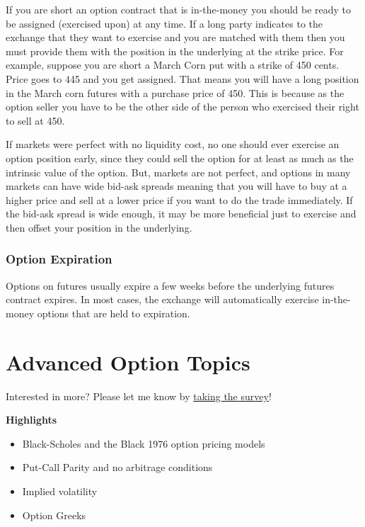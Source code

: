 \documentclass[
  letterpaper,
  DIV=11,
  numbers=noendperiod]{scrreprt}
\begin{document}
If you are short an option contract that is in-the-money you should be
ready to be assigned (exercised upon) at any time. If a long party
indicates to the exchange that they want to exercise and you are matched
with them then you must provide them with the position in the underlying
at the strike price. For example, suppose you are short a March Corn put
with a strike of 450 cents. Price goes to 445 and you get assigned. That
means you will have a long position in the March corn futures with a
purchase price of 450. This is because as the option seller you have to
be the other side of the person who exercised their right to sell at
450.

If markets were perfect with no liquidity cost, no one should ever
exercise an option position early, since they could sell the option for
at least as much as the intrinsic value of the option. But, markets are
not perfect, and options in many markets can have wide bid-ask spreads
meaning that you will have to buy at a higher price and sell at a lower
price if you want to do the trade immediately. If the bid-ask spread is
wide enough, it may be more beneficial just to exercise and then offset
your position in the underlying.

\subsection{Option Expiration}\label{option-expiration}

Options on futures usually expire a few weeks before the underlying
futures contract expires. In most cases, the exchange will automatically
exercise in-the-money options that are held to expiration.


\chapter{Advanced Option Topics}\label{advanced-option-topics}

{Interested in more? Please let me know by}
\href{https://forms.gle/Q3VByCQZHjfQSy9D7}{taking the survey}!

\textbf{Highlights}

\begin{itemize}
\item
  Black-Scholes and the Black 1976 option pricing models
\item
  Put-Call Parity and no arbitrage conditions
\item
  Implied volatility
\item
  Option Greeks
\end{itemize}
\end{document}
